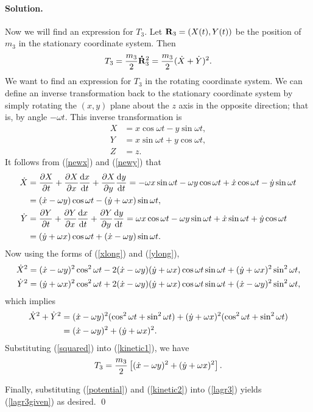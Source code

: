 \documentclass[11pt]{article}
\newcommand{\refeq}[1]{(\ref{#1})}
\newenvironment{solution}
{
    \paragraph{Solution.}
    \ignorespaces
}
{
    \bigskip
}
\begin{document}
\begin{solution}
	Now we will find an expression for $T_3$.  Let $\mathbf{R}_3 = (X(t), Y(t))$ be the position of $m_3$ in the stationary coordinate system.  Then
	\begin{equation} \label{kinetic1}
		T_3 = \frac{m_3}{2} \mathbf{\dot{R}}_3^2 = \frac{m_3}{2} (\dot{X} + \dot{Y})^2.
	\end{equation}
	We want to find an expression for $T_3$ in the rotating coordinate system.  We can define an inverse transformation back to the stationary coordinate system by simply rotating the $(x, y)$ plane about the $z$ axis in the opposite direction; that is, by angle $-\omega t$.  This inverse transformation is
	\begin{align}
		X &= x \cos{\omega t} - y \sin{\omega t}, \label{newx} \\
		Y &= x \sin{\omega t} + y \cos{\omega t},  \label{newy} \\
		Z &= z.
	\end{align}
	It follows from \refeq{newx} and \refeq{newy} that
	\begin{align}
		\dot{X} &= \pdv{X}{t} + \pdv{X}{x} \dv{x}{t} + \pdv{X}{y} \dv{y}{t} = - \omega x \sin{\omega t} - \omega y \cos{\omega t} + \dot{x} \cos{\omega t} - \dot{y} \sin{\omega t} \label{xlong} \\
			&= (\dot{x} - \omega y) \cos{\omega t} - (\dot{y} + \omega x) \sin{\omega t}, \\
		\dot{Y} &= \pdv{Y}{t} + \pdv{Y}{x} \dv{x}{t} + \pdv{Y}{y} \dv{y}{t} =  \omega x \cos{\omega t} - \omega y \sin{\omega t} + \dot{x} \sin{\omega t} + \dot{y} \cos{\omega t} \label{ylong} \\
		&= (\dot{y} + \omega x) \cos{\omega t} + (\dot{x} - \omega y) \sin{\omega t}.
	\end{align}
	Now using the forms of \refeq{xlong} and \refeq{ylong},
	\begin{align}
		\dot{X}^2 &= (\dot{x} - \omega y)^2 \cos^2{\omega t} - 2 (\dot{x} - \omega y) (\dot{y} + \omega x) \cos{\omega t} \sin{\omega t} + (\dot{y} + \omega x)^2 \sin^2{\omega t}, \\
		\dot{Y}^2 &= (\dot{y} + \omega x)^2 \cos^2{\omega t} + 2 (\dot{x} - \omega y) (\dot{y} + \omega x) \cos{\omega t} \sin{\omega t} + (\dot{x} - \omega y)^2 \sin^2{\omega t},
	\end{align}
	which implies
	\begin{align}
		\dot{X}^2 + \dot{Y}^2 &= (\dot{x} - \omega y)^2 (\cos^2{\omega t} + \sin^2{\omega t}) + (\dot{y} + \omega x)^2 (\cos^2{\omega t} + \sin^2{\omega t}) \\
		&= (\dot{x} - \omega y)^2 + (\dot{y} + \omega x)^2. \label{squared}
	\end{align}
	Substituting \refeq{squared} into \refeq{kinetic1}, we have
	\begin{equation} \label{kinetic2}
		T_3 = \frac{m_3}{2} \left[ (\dot{x} - \omega y)^2 + (\dot{y} + \omega x)^2 \right].
	\end{equation}
	
	Finally, substituting \refeq{potential} and \refeq{kinetic2} into \refeq{lagr3} yields \refeq{lagr3given} as desired. \qed
\end{solution}
\end{document}
